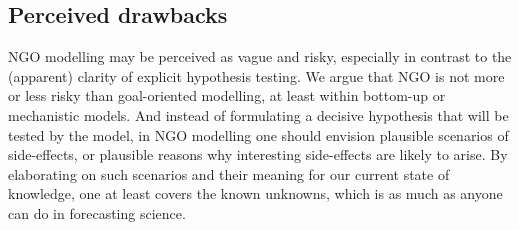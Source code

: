 \subsection{Perceived drawbacks}

NGO modelling may be perceived as vague and risky, especially in contrast to the (apparent) clarity of explicit hypothesis testing. We argue that NGO is not more or less risky than goal-oriented modelling, at least within bottom-up or mechanistic models. And instead of formulating a decisive hypothesis that will be tested by the model, in NGO modelling one should envision plausible scenarios of side-effects, or plausible reasons why interesting side-effects are likely to arise. By elaborating on such scenarios and their meaning for our current state of knowledge, one at least covers the known unknowns, which is as much as anyone can do in forecasting science.